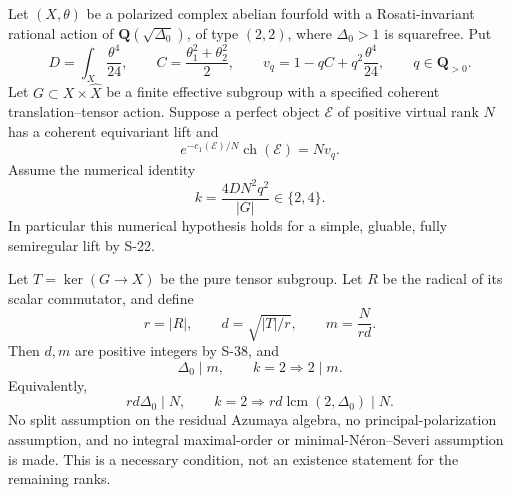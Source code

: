 \begin{theorem}
\label{thm:semireg-reduced-rank-brauer-cover}
Let \((X,\theta)\) be a polarized complex abelian fourfold with a Rosati-invariant rational action of \(\mathbf Q(\sqrt{\Delta_0})\), of type \((2,2)\), where \(\Delta_0>1\) is squarefree. Put \[
 D=\int_X\frac{\theta^4}{24},\qquad
 C=\frac{\theta_1^2+\theta_2^2}{2},\qquad
 v_q=1-qC+q^2\frac{\theta^4}{24},\qquad q\in\mathbf Q_{>0}.
\] Let \(G\subset X\times\widehat X\) be a finite effective subgroup with a specified coherent translation--tensor action. Suppose a perfect object \(\mathcal E\) of positive virtual rank \(N\) has a coherent equivariant lift and \[
 e^{-c_1(\mathcal E)/N}\operatorname{ch}(\mathcal E)=Nv_q.
 \tag{S41.1}
\] Assume the numerical identity \[
 k=\frac{4DN^2q^2}{|G|}\in\{2,4\}.
 \tag{S41.2}
\] In particular this numerical hypothesis holds for a simple, gluable, fully semiregular lift by S-22.

Let \(T=\ker(G\to X)\) be the pure tensor subgroup. Let \(R\) be the radical of its scalar commutator, and define \[
 r=|R|,\qquad d=\sqrt{|T|/r},\qquad
 m=\frac{N}{rd}.
 \tag{S41.3}
\] Then \(d,m\) are positive integers by S-38, and \[
 \boxed{\Delta_0\mid m,\qquad k=2\Longrightarrow2\mid m.}
 \tag{S41.4}
\] Equivalently, \[
 rd\Delta_0\mid N,\qquad
 k=2\Longrightarrow rd\operatorname{lcm}(2,\Delta_0)\mid N.
 \tag{S41.5}
\] No split assumption on the residual Azumaya algebra, no principal-polarization assumption, and no integral maximal-order or minimal-Néron--Severi assumption is made. This is a necessary condition, not an existence statement for the remaining ranks.
\end{theorem}
